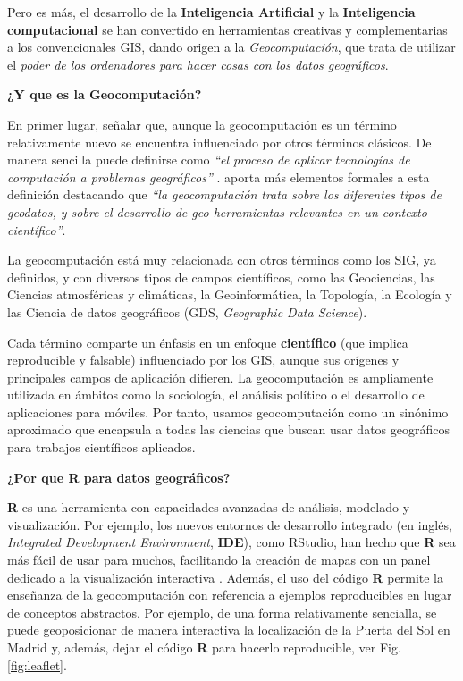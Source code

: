 \documentclass[
]{book}
\theoremstyle{definition}
\theoremstyle{definition}
\theoremstyle{definition}
\theoremstyle{definition}
\theoremstyle{remark}
\begin{document}
Pero es más, el desarrollo de la \textbf{Inteligencia Artificial} y la \textbf{Inteligencia
computacional} se han convertido en herramientas creativas y complementarias a
los convencionales GIS, dando origen a la \emph{Geocomputación}, que trata de
utilizar el \emph{poder de los ordenadores para hacer cosas con los datos
geográficos}.

\textbf{¿Y que es la Geocomputación?}

En primer lugar, señalar que, aunque la geocomputación es un término
relativamente nuevo se encuentra influenciado por otros términos clásicos. De
manera sencilla puede definirse como \emph{``el proceso de aplicar tecnologías de
computación a problemas geográficos''} \citep{rees1998}. \citet{Openshaw_Abrahart_2000}
aporta más elementos formales a esta definición destacando que \emph{``la
geocomputación trata sobre los diferentes tipos de geodatos, y sobre el
desarrollo de geo-herramientas relevantes en un contexto científico''}.

La geocomputación está muy relacionada con otros términos como los SIG, ya
definidos, y con diversos tipos de campos científicos, como las Geociencias, las
Ciencias atmosféricas y climáticas, la Geoinformática, la Topología, la Ecología
y las Ciencia de datos geográficos (GDS, \emph{Geographic Data Science}).

Cada término comparte un énfasis en un enfoque \textbf{científico} (que implica
reproducible y falsable) influenciado por los GIS, aunque sus orígenes y
principales campos de aplicación difieren. La geocomputación es ampliamente
utilizada en ámbitos como la sociología, el análisis político o el desarrollo de
aplicaciones para móviles. Por tanto, usamos geocomputación como un sinónimo
aproximado que encapsula a todas las ciencias que buscan usar datos geográficos
para trabajos científicos aplicados.

\textbf{¿Por que R para datos geográficos?}

\textbf{R} es una herramienta con capacidades avanzadas de análisis, modelado y
visualización. Por ejemplo, los nuevos entornos de desarrollo integrado (en
inglés, \emph{Integrated Development Environment}, \textbf{IDE}), como RStudio, han hecho
que \textbf{R} sea más fácil de usar para muchos, facilitando la creación de mapas
con un panel dedicado a la visualización interactiva \citep{Lovelance_et_al_2019}.
Además, el uso del código \textbf{R} permite la enseñanza de la geocomputación con
referencia a ejemplos reproducibles en lugar de conceptos abstractos. Por
ejemplo, de una forma relativamente sencialla, se puede geoposicionar de manera
interactiva la localización de la Puerta del Sol en Madrid y, además, dejar el
código \textbf{R} para hacerlo reproducible, ver Fig. \ref{fig:leaflet}.
\end{document}
